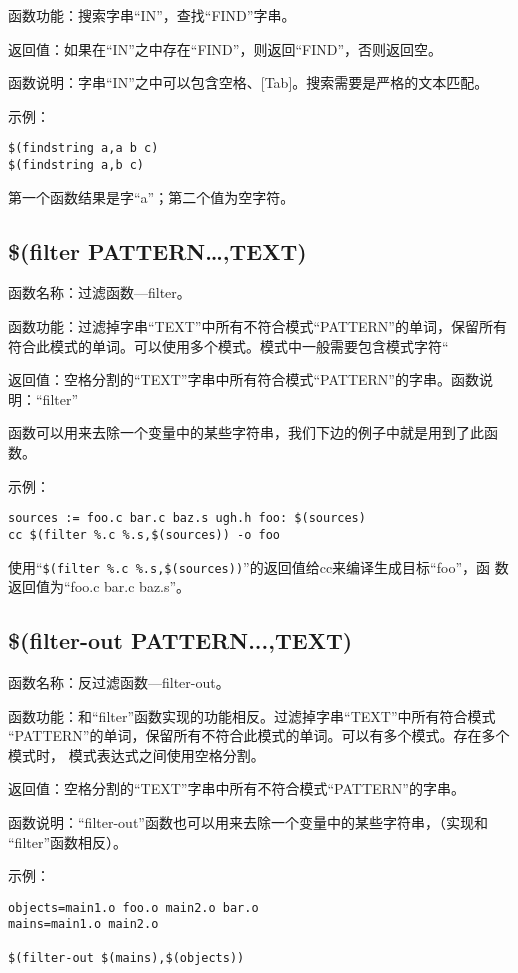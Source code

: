 函数功能：搜索字串“IN”，查找“FIND”字串。

返回值：如果在“IN”之中存在“FIND”，则返回“FIND”，否则返回空。

函数说明：字串“IN”之中可以包含空格、[Tab]。搜索需要是严格的文本匹配。

示例：
\begin{Verbatim}[]
$(findstring a,a b c)
$(findstring a,b c)
\end{Verbatim}
第一个函数结果是字“a”；第二个值为空字符。

\subsection{\$(filter PATTERN…,TEXT)}
函数名称：过滤函数—filter。

函数功能：过滤掉字串“TEXT”中所有不符合模式“PATTERN”的单词，保留所有符合此模式的单词。可以使用多个模式。模式中一般需要包含模式字符“%

返回值：空格分割的“TEXT”字串中所有符合模式“PATTERN”的字串。函数说明：“filter”

函数可以用来去除一个变量中的某些字符串，我们下边的例子中就是用到了此函数。

示例：
\begin{Verbatim}[]
sources := foo.c bar.c baz.s ugh.h foo: $(sources)
cc $(filter %.c %.s,$(sources)) -o foo
\end{Verbatim}
使用“\verb"$(filter %.c %.s,$(sources))"”的返回值给cc来编译生成目标“foo”，函
数返回值为“foo.c bar.c baz.s”。

\subsection{\$(filter-out PATTERN...,TEXT)}

函数名称：反过滤函数—filter-out。

函数功能：和“filter”函数实现的功能相反。过滤掉字串“TEXT”中所有符合模式
“PATTERN”的单词，保留所有不符合此模式的单词。可以有多个模式。存在多个模式时，
模式表达式之间使用空格分割。

返回值：空格分割的“TEXT”字串中所有不符合模式“PATTERN”的字串。

函数说明：“filter-out”函数也可以用来去除一个变量中的某些字符串，（实现和
“filter”函数相反）。

示例：
\begin{Verbatim}[]
objects=main1.o foo.o main2.o bar.o
mains=main1.o main2.o

$(filter-out $(mains),$(objects))
\end{Verbatim}

